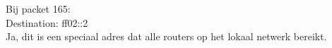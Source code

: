 Bij packet 165:\\

Destination: ff02::2\\
Ja, dit is een speciaal adres dat alle routers op het lokaal netwerk bereikt.
